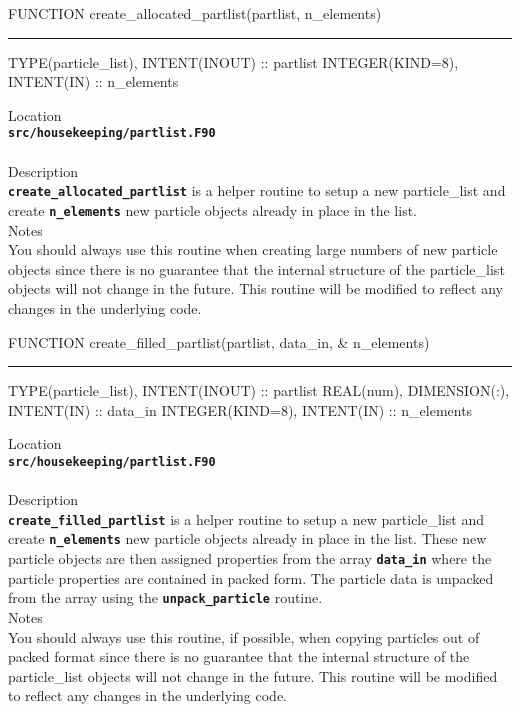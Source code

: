 \documentclass[12pt,a4paper]{article}
\newcommand{\HRule}{\rule[0.3cm]{\linewidth}{0.5mm}}
\newcommand{\inlinecode}[1]{{\color{warwickred} \bf\texttt{#1}}}
\begin{document}
\pagebreak
\begin{codedef}
FUNCTION create_allocated_partlist(partlist, n_elements)
\HRule
TYPE(particle_list), INTENT(INOUT) :: partlist
INTEGER(KIND=8), INTENT(IN) :: n_elements
\end{codedef}
\vspace{1cm}
{\Large Location\\}
\inlinecode{src/housekeeping/partlist.F90}\\
\\[0.5cm]
{\Large Description\\}
\inlinecode{create\_allocated\_partlist} is a helper routine to setup a new
particle\_list and create \inlinecode{n\_elements} new particle objects already
in place in the list.
\\[0.5cm]
{\Large Notes\\}
You should always use this routine when creating large numbers of new particle
objects since there is no guarantee that the internal structure of the
particle\_list objects will not change in the future. This routine will
be modified to reflect any changes in the underlying code.

\pagebreak
\begin{codedef}
FUNCTION create_filled_partlist(partlist, data_in, &
    n_elements)
\HRule
TYPE(particle_list), INTENT(INOUT) :: partlist
REAL(num), DIMENSION(:), INTENT(IN) :: data_in
INTEGER(KIND=8), INTENT(IN) :: n_elements
\end{codedef}
\vspace{1cm}
{\Large Location\\}
\inlinecode{src/housekeeping/partlist.F90}\\
\\[0.5cm]
{\Large Description\\}
\inlinecode{create\_filled\_partlist} is a helper routine to setup a new
particle\_list and create \inlinecode{n\_elements} new particle objects already
in place in the list. These new particle objects are then assigned properties
from the array \inlinecode{data\_in} where the particle properties are contained
in packed form. The particle data is unpacked from the array using the
\inlinecode{unpack\_particle} routine.
\\[0.5cm]
{\Large Notes\\}
You should always use this routine, if possible, when copying particles out of
packed format since there is no guarantee that the internal structure of the
particle\_list objects will not change in the future. This routine will
be modified to reflect any changes in the underlying code.
\end{document}
